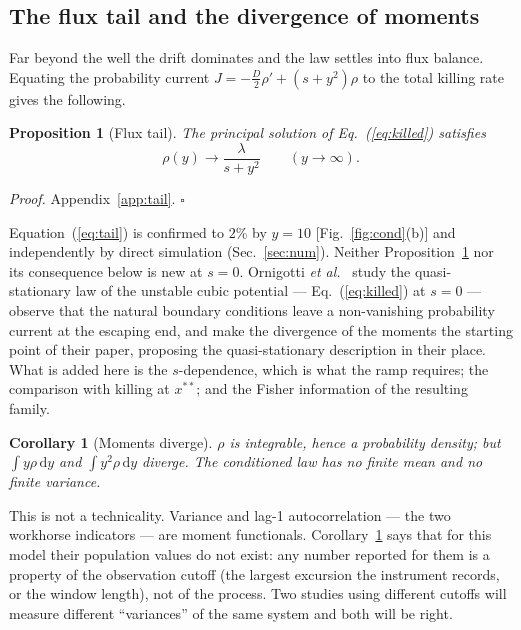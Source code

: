 \documentclass[%
 twocolumn,
 superscriptaddress,
 amsmath,amssymb,
 aps,
 pre,
 floatfix,
]{revtex4-2}
\newtheorem{proposition}{Proposition}
\newtheorem{corollary}{Corollary}
\newcommand{\dd}{\mathrm{d}}
\begin{document}
\subsection{The flux tail and the divergence of moments}

Far beyond the well the drift dominates and the law settles into flux balance.  Equating the probability current $J=-\tfrac D2\rho'+(s+y^2)\rho$ to the total killing rate gives the following.

\begin{proposition}[Flux tail]
\label{prop:tail}
The principal solution of Eq.~(\ref{eq:killed}) satisfies
\begin{equation}
\label{eq:tail}
\rho(y)\longrightarrow \frac{\lambda}{s+y^2}\qquad(y\to\infty).
\end{equation}
\end{proposition}

\noindent\textit{Proof.} Appendix~\ref{app:tail}. $\square$

Equation~(\ref{eq:tail}) is confirmed to $2\%$ by $y=10$ [Fig.~\ref{fig:cond}(b)] and independently by direct simulation (Sec.~\ref{sec:num}).  Neither Proposition~\ref{prop:tail} nor its consequence below is new at $s=0$.  Ornigotti \emph{et al.}~\cite{Ornigotti2018} study the quasi-stationary law of the unstable cubic potential --- Eq.~(\ref{eq:killed}) at $s=0$ --- observe that the natural boundary conditions leave a non-vanishing probability current at the escaping end, and make the divergence of the moments the starting point of their paper, proposing the quasi-stationary description in their place.  What is added here is the $s$-dependence, which is what the ramp requires; the comparison with killing at $x^{\ast\ast}$; and the Fisher information of the resulting family.

\begin{corollary}[Moments diverge]
\label{cor:moments}
$\rho$ is integrable, hence a probability density; but $\int y\rho\,\dd y$ and $\int y^2\rho\,\dd y$ diverge.  The conditioned law has no finite mean and no finite variance.
\end{corollary}

This is not a technicality.  Variance and lag-1 autocorrelation --- the two workhorse indicators --- are moment functionals.  Corollary~\ref{cor:moments} says that for this model their population values do not exist: any number reported for them is a property of the observation cutoff (the largest excursion the instrument records, or the window length), not of the process.  Two studies using different cutoffs will measure different ``variances'' of the same system and both will be right.
\end{document}
